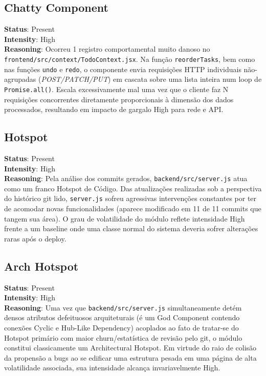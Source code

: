 \subsection*{Chatty Component}
\textbf{Status}: Present \\
\textbf{Intensity}: High \\
\textbf{Reasoning}: Ocorreu 1 registro comportamental muito danoso no \texttt{frontend/src/context/TodoContext.jsx}. Na função \texttt{reorderTasks}, bem como nas funções \texttt{undo} e \texttt{redo}, o componente envia requisições HTTP individuais não-agrupadas (\textit{POST/PATCH/PUT}) em cascata sobre uma lista inteira num loop de \texttt{Promise.all()}. Escala excessivamente mal uma vez que o cliente faz N requisições concorrentes diretamente proporcionais à dimensão dos dados processados, resultando em impacto de gargalo High para rede e API.

\subsection*{Hotspot}
\textbf{Status}: Present \\
\textbf{Intensity}: High \\
\textbf{Reasoning}: Pela análise dos commits gerados, \texttt{backend/src/server.js} atua como um franco Hotspot de Código. Das atualizações realizadas sob a perspectiva do histórico git lido, \texttt{server.js} sofreu agressivas intervenções constantes por ter de acomodar novas funcionalidades (aparece modificado em 11 de 11 commits que tangem sua área). O grau de volatilidade do módulo reflete intensidade High frente a um baseline onde uma classe normal do sistema deveria sofrer alterações raras após o deploy.

\subsection*{Arch Hotspot}
\textbf{Status}: Present \\
\textbf{Intensity}: High \\
\textbf{Reasoning}: Uma vez que \texttt{backend/src/server.js} simultaneamente detém densos atributos defeituosos arquiteturais (é um God Component contendo conexões Cyclic e Hub-Like Dependency) acoplados ao fato de tratar-se do Hotspot primário com maior churn/estatística de revisão pelo git, o módulo constitui classicamente um Architectural Hotspot. Em virtude do raio de colisão da propensão a bugs ao se edificar uma estrutura pesada em uma página de alta volatilidade associada, sua intensidade alcança invariavelmente High.
